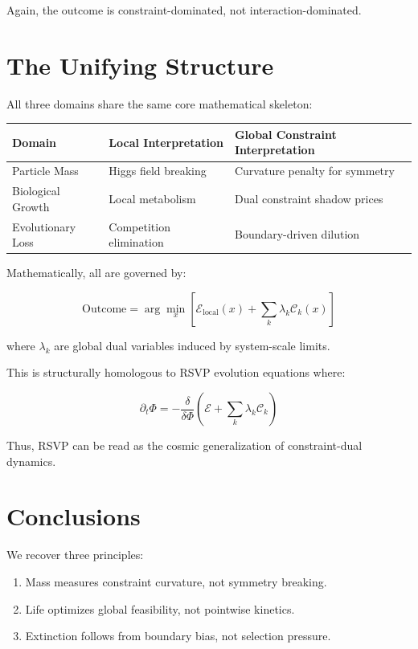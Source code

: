 \documentclass[11pt,a4paper]{article}
\begin{document}
Again, the outcome is constraint-dominated, not interaction-dominated.

\section{The Unifying Structure}

All three domains share the same core mathematical skeleton:

\begin{center}
\begin{tabular}{lll}
\toprule
Domain & Local Interpretation & Global Constraint Interpretation \\
\midrule
Particle Mass & Higgs field breaking & Curvature penalty for symmetry \\
Biological Growth & Local metabolism & Dual constraint shadow prices \\
Evolutionary Loss & Competition elimination & Boundary-driven dilution \\
\bottomrule
\end{tabular}
\end{center}

Mathematically, all are governed by:

\begin{equation}
\text{Outcome} = \arg\min_x \left[ \mathcal{E}_\text{local}(x) + \sum_k \lambda_k \mathcal{C}_k(x) \right]
\end{equation}

where $\lambda_k$ are global dual variables induced by system-scale limits.

This is structurally homologous to RSVP evolution equations where:

\begin{equation}
\partial_t \Phi = -\frac{\delta}{\delta \Phi} \left( \mathcal{E} + \sum_k \lambda_k \mathcal{C}_k \right)
\end{equation}

Thus, RSVP can be read as the cosmic generalization of constraint-dual dynamics.

\section{Conclusions}

We recover three principles:

\begin{enumerate}
    \item Mass measures constraint curvature, not symmetry breaking.
    \item Life optimizes global feasibility, not pointwise kinetics.
    \item Extinction follows from boundary bias, not selection pressure.
\end{enumerate}
\end{document}
